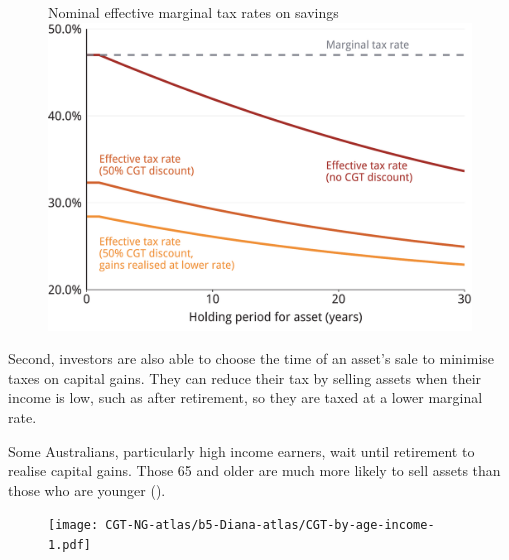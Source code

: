 \begin{figure}
%
{Nominal effective marginal tax rates on savings}\label{fig:CG-marginal-tax-rates-delayed}
\includegraphics[width=\columnwidth]{CGT-NG-atlas/b5-palatino-atlas/CG-marginal-tax-rates-delayed-1.pdf}

\end{figure}


Second, investors are also able to choose the time of an asset's sale to minimise taxes on capital gains. They can reduce their tax by selling assets when their income is low, such as after retirement, so they are taxed at a lower marginal rate. 

Some Australians, particularly high income earners, wait until retirement to realise capital gains. Those 65 and older are much more likely to sell assets than those who are younger ().

\begin{figure}
\label{fig:CGT-by-age-income}
\texttt{[image: CGT-NG-atlas/b5-Diana-atlas/CGT-by-age-income-1.pdf]}
\end{figure}


